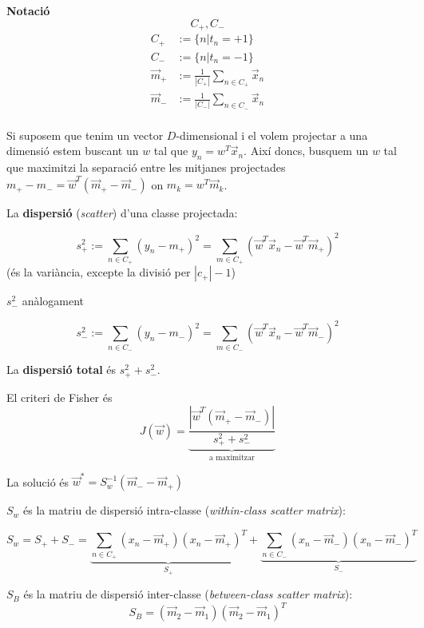 \documentclass[a4paper]{article}
\begin{document}

\textbf{Notació}
$$  C_+, C_-  $$
\begin{align*}
	C_+ &:= \{ n | t_n = +1 \} \\
	C_- &:= \{ n | t_n = -1 \} \\
	\vec{m}_+ &:= \frac{1}{|C_+|} \sum_{n\in C_+} \vec{x}_n \\
	\vec{m}_- &:= \frac{1}{|C_-|} \sum_{n\in C_-} \vec{x}_n \\
\end{align*}

Si suposem que tenim un vector $D$-dimensional i el volem projectar a una dimensió estem buscant un $w$ tal que $y_n = w^T \vec{x}_n$. Així doncs, busquem un $w$ tal que maximitzi la separació entre les mitjanes projectades $m_+ - m_- = \vec{w}^T(\vec{m}_+ - \vec{m}_-)$ on $m_k = w^T \vec{m}_k$.

La \textbf{dispersió} (\emph{scatter}) d'una classe projectada:

$$  
s_+^2 := \sum_{n \in C_+} (y_n - m_+)^2 = 
\sum_{m \in C_+} (\vec{w}^T \vec{x}_n - \vec{w}^T \vec{m}_+)^2
$$
(és la variància, excepte la divisió per $|c_+| - 1$)

$s_-^2$ anàlogament 

$$
s_-^2 := \sum_{n \in C_-} (y_n - m_-)^2 = 
\sum_{m \in C_-} (\vec{w}^T \vec{x}_n - \vec{w}^T \vec{m}_-)^2
$$

La \textbf{dispersió total} és $s_+^2 + s_-^2$.

El criteri de Fisher és $$  J(\vec{w}) = \underbrace{\frac{|\vec{w}^T(\vec{m}_+-\vec{m}_-)|}{s_+^2 + s_-^2}}_\text{a maximitzar}  $$

La solució és $\vec{w}^* = S_w^{-1}(\vec{m}_- - \vec{m}_+)$

$S_w$ és la matriu de dispersió intra-classe (\emph{within-class scatter matrix}):

$$
S_w = S_+ + S_- = 
\underbrace{\sum_{n \in C_+} (x_n - \vec{m}_+)(x_n - \vec{m}_+)^T}_{S_+} +
\underbrace{\sum_{n \in C_-} (x_n - \vec{m}_-)(x_n - \vec{m}_-)^T}_{S_-}  
$$


$S_B$ és la matriu de dispersió inter-classe (\emph{between-class scatter matrix}):
$$
S_B = (\vec{m}_2 - \vec{m}_1)(\vec{m}_2 - \vec{m}_1)^T
$$

	
\end{document}
